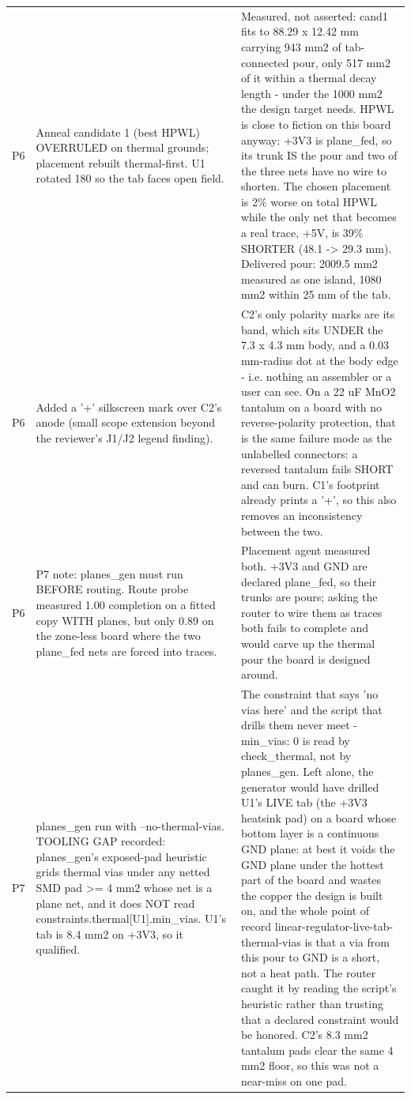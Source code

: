 \documentclass[11pt,a4paper]{article}
\begin{document}
{\begin{longtable}{lp{5.2cm}p{7.2cm}}
P6 & Anneal candidate 1 (best HPWL) OVERRULED on thermal grounds; placement rebuilt thermal-first. U1 rotated 180 so the tab faces open field. & Measured, not asserted: cand1 fits to 88.29 x 12.42 mm carrying 943 mm2 of tab-connected pour, only 517 mm2 of it within a thermal decay length - under the 1000 mm2 the design target needs. HPWL is close to fiction on this board anyway: +3V3 is plane\_fed, so its trunk IS the pour and two of the three nets have no wire to shorten. The chosen placement is 2\% worse on total HPWL while the only net that becomes a real trace, +5V, is 39\% SHORTER (48.1 -\textgreater{} 29.3 mm). Delivered pour: 2009.5 mm2 measured as one island, 1080 mm2 within 25 mm of the tab. \\
P6 & Added a '+' silkscreen mark over C2's anode (small scope extension beyond the reviewer's J1/J2 legend finding). & C2's only polarity marks are its band, which sits UNDER the 7.3 x 4.3 mm body, and a 0.03 mm-radius dot at the body edge - i.e. nothing an assembler or a user can see. On a 22 uF MnO2 tantalum on a board with no reverse-polarity protection, that is the same failure mode as the unlabelled connectors: a reversed tantalum fails SHORT and can burn. C1's footprint already prints a '+', so this also removes an inconsistency between the two. \\
P6 & P7 note: planes\_gen must run BEFORE routing. Route probe measured 1.00 completion on a fitted copy WITH planes, but only 0.89 on the zone-less board where the two plane\_fed nets are forced into traces. & Placement agent measured both. +3V3 and GND are declared plane\_fed, so their trunks are pours; asking the router to wire them as traces both fails to complete and would carve up the thermal pour the board is designed around. \\
P7 & planes\_gen run with --no-thermal-vias. TOOLING GAP recorded: planes\_gen's exposed-pad heuristic grids thermal vias under any netted SMD pad \textgreater{}= 4 mm2 whose net is a plane net, and it does NOT read constraints.thermal{[}U1{]}.min\_vias. U1's tab is 8.4 mm2 on +3V3, so it qualified. & The constraint that says 'no vias here' and the script that drills them never meet - min\_vias: 0 is read by check\_thermal, not by planes\_gen. Left alone, the generator would have drilled U1's LIVE tab (the +3V3 heatsink pad) on a board whose bottom layer is a continuous GND plane: at best it voids the GND plane under the hottest part of the board and wastes the copper the design is built on, and the whole point of record linear-regulator-live-tab-thermal-vias is that a via from this pour to GND is a short, not a heat path. The router caught it by reading the script's heuristic rather than trusting that a declared constraint would be honored. C2's 8.3 mm2 tantalum pads clear the same 4 mm2 floor, so this was not a near-miss on one pad. \\

\end{longtable}}
\end{document}
